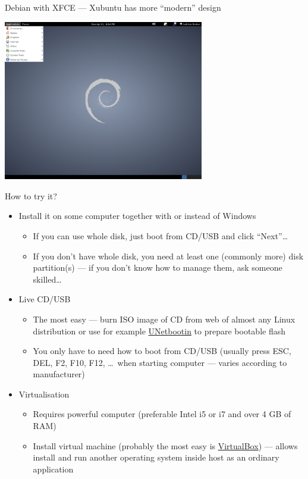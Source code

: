 \documentclass[compress, ucs, xelatex, 11pt, xcolor=svgnames,
  hyperref={
    bookmarks=true,
    unicode=true,
    colorlinks=true,
    pdftitle={Linux, command line and MetaCentrum},
    plainpages=false,
    pdfauthor={Vojtech Zeisek},
    pdfsubject={Course about use of Linux command line, writing shell scripts and using MetaCentrum of CESNET},
    pdfcreator={XeLaTeX, http://www.xelatex.org/},
    pdfkeywords={Linux, GNU, BASH, shell, command line, MetaCentrum},
    linkcolor=Sienna,
    anchorcolor=black,
    citecolor=green,
    filecolor=magenta,
    menucolor=Sienna,
    urlcolor=cyan,
    pdftex},
  url={hyphens, lowtilde} %
  ]{beamer}
\begin{document}
\begin{frame}{Debian with XFCE --- Xubuntu has more ``modern'' design}
\begin{center}
  \includegraphics[height=7cm]{debian.png}
\end{center}
\end{frame}

\begin{frame}{How to try it?}
\begin{itemize}
  \item Install it on some computer together with or instead of Windows
  \begin{itemize}
    \item If you can use whole disk, just boot from CD/USB and click ``Next''\ldots
    \item If you don't have whole disk, you need at least one (commonly more) disk partition(s) --- if you don't know how to manage them, ask someone skilled\ldots
  \end{itemize}
  \item Live CD/USB
  \begin{itemize}
    \item The most easy --- burn ISO image of CD from web of almost any Linux distribution or use for example \href{https://unetbootin.github.io/}{UNetbootin} to prepare bootable flash
    \item You only have to need how to boot from CD/USB (usually press ESC, DEL, F2, F10, F12, \ldots~when starting computer --- varies according to manufacturer)
  \end{itemize}
  \item Virtualisation
  \begin{itemize}
    \item Requires powerful computer (preferable Intel i5 or i7 and over 4 GB of RAM)
    \item Install virtual machine (probably the most easy is \href{https://www.virtualbox.org/}{VirtualBox}) --- allows install and run another operating system inside host as an ordinary application
  \end{itemize}
\end{itemize}
\end{frame}
\end{document}
